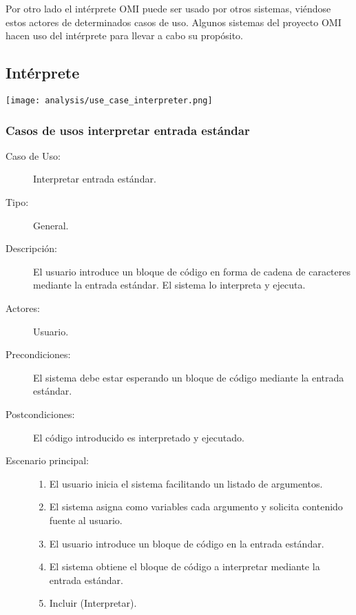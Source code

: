 Por otro lado el intérprete OMI puede ser usado por otros sistemas, viéndose estos actores de determinados casos
de uso. Algunos sistemas del proyecto OMI hacen uso del intérprete para llevar  a cabo su propósito.


\subsection{Intérprete}
\begin{center}
\texttt{[image: analysis/use\_case\_interpreter.png]} 
\end{center}
\subsubsection{Casos de usos interpretar entrada estándar}

\begin{description}
  \item[Caso de Uso:] 
  Interpretar entrada estándar.
  \item[Tipo:] General.
  \item[Descripción:] 
  El usuario introduce un bloque de código en forma de cadena de 
  caracteres mediante la entrada estándar. El sistema lo interpreta 
  y ejecuta.
  \item[Actores:] 
  Usuario.
  \item[Precondiciones:] 
  El sistema debe estar esperando un bloque de código mediante la entrada estándar.
  \item[Postcondiciones:] 
  El código introducido es interpretado y ejecutado.
  \item[Escenario principal:] \hfill 
  \begin{enumerate}
   \item El usuario inicia el sistema facilitando un listado de argumentos.
   \item El sistema asigna como variables cada argumento y solicita contenido fuente al usuario. 
   \item El usuario introduce un bloque de código en la entrada estándar.
   \item El sistema obtiene el bloque de código a interpretar mediante la entrada estándar.
   \item Incluir (Interpretar). 
  \end{enumerate}
\end{description}
